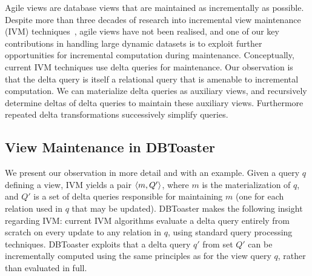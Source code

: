 \label{sec:compilation}

Agile views are database views that are maintained as incrementally as possible.
Despite more than three decades of research into incremental view
maintenance (IVM)
techniques~\cite{griffin-sigmod:95,roussopoulos-tods:91,zhou-vldb:07,zhou-icde:07},
agile views have not been realised, and one of our key contributions in handling
large dynamic datasets is to exploit further opportunities for incremental
computation during maintenance.
Conceptually, current IVM techniques use delta queries for maintenance. Our
observation is that the delta query is itself a relational query that is
amenable to incremental computation. We can materialize delta queries as
auxiliary views, and recursively determine deltas of delta queries
to maintain these auxiliary views.
Furthermore repeated delta transformations successively simplify queries.


\subsection{View Maintenance in DBToaster}
We present our observation in more detail and with an example. Given a query $q$
defining a view, IVM yields a pair ${\langle m,Q'\rangle}$, where $m$ is the
materialization of $q$, and $Q'$ is a set of delta queries responsible for
maintaining $m$ (one for each relation used in $q$ that may be updated).
DBToaster makes the following insight regarding IVM: current IVM algorithms
evaluate a delta query entirely from scratch on every update to any relation
in $q$, using standard query processing techniques. DBToaster exploits that a
delta query $q'$ from set $Q'$
can be incrementally computed using the same principles as for
the view query $q$, rather than evaluated in full.

